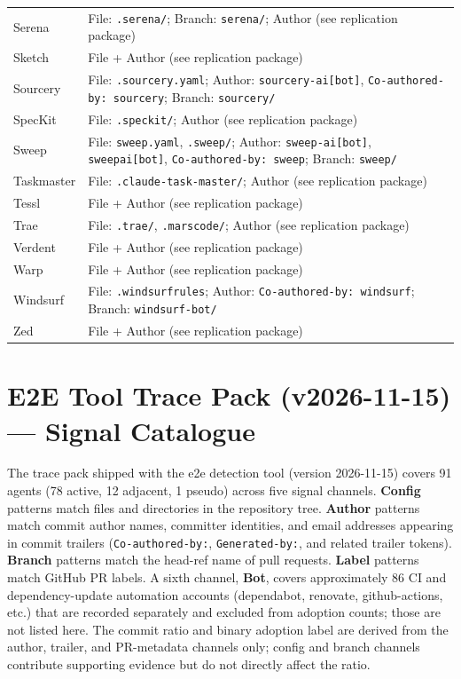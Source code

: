 \begin{small}
\begin{longtable}{@{}p{3.0cm}p{11.5cm}@{}}
Serena           & File: \texttt{.serena/}; Branch: \texttt{serena/}; Author (see replication package) \\
Sketch           & File + Author (see replication package) \\
Sourcery         & File: \texttt{.sourcery.yaml}; Author: \texttt{sourcery-ai[bot]}, \texttt{Co-authored-by: sourcery}; Branch: \texttt{sourcery/} \\
SpecKit          & File: \texttt{.speckit/}; Author (see replication package) \\
Sweep            & File: \texttt{sweep.yaml}, \texttt{.sweep/}; Author: \texttt{sweep-ai[bot]}, \texttt{sweepai[bot]}, \texttt{Co-authored-by: sweep}; Branch: \texttt{sweep/} \\
Taskmaster       & File: \texttt{.claude-task-master/}; Author (see replication package) \\
Tessl            & File + Author (see replication package) \\
Trae             & File: \texttt{.trae/}, \texttt{.marscode/}; Author (see replication package) \\
Verdent          & File + Author (see replication package) \\
Warp             & File + Author (see replication package) \\
Windsurf         & File: \texttt{.windsurfrules}; Author: \texttt{Co-authored-by: windsurf}; Branch: \texttt{windsurf-bot/} \\
Zed              & File + Author (see replication package) \\

\end{longtable}
\end{small}

\section{E2E Tool Trace Pack (v2026-11-15) --- Signal Catalogue}
\label{app:e2e-agents}

The trace pack shipped with the e2e detection tool (version 2026-11-15) covers 91 agents (78 active, 12 adjacent, 1 pseudo) across five signal channels. \textbf{Config} patterns match files and directories in the repository tree. \textbf{Author} patterns match commit author names, committer identities, and email addresses appearing in commit trailers (\texttt{Co-authored-by:}, \texttt{Generated-by:}, and related trailer tokens). \textbf{Branch} patterns match the head-ref name of pull requests. \textbf{Label} patterns match GitHub PR labels. A sixth channel, \textbf{Bot}, covers approximately 86 CI and dependency-update automation accounts (dependabot, renovate, github-actions, etc.) that are recorded separately and excluded from adoption counts; those are not listed here. The commit ratio and binary adoption label are derived from the author, trailer, and PR-metadata channels only; config and branch channels contribute supporting evidence but do not directly affect the ratio.

